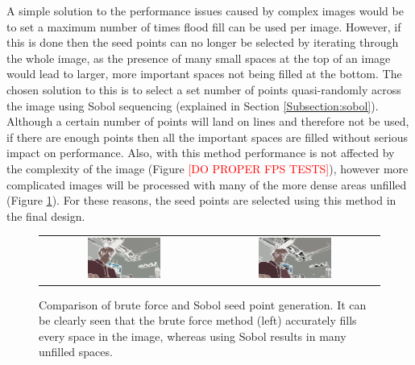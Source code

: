 A simple solution to the performance issues caused by complex images would be to set a maximum number of times flood fill can be used per image. However, if this is done then the seed points can no longer be selected by iterating through the whole image, as the presence of many small spaces at the top of an image would lead to larger, more important spaces not being filled at the bottom. The chosen solution to this is to select a set number of points quasi-randomly across the image using Sobol sequencing (explained in Section \ref{Subsection:sobol}). Although a certain number of points will land on lines and therefore not be used, if there are enough points then all the important spaces are filled without serious impact on performance. Also, with this method performance is not affected by the complexity of the image (Figure \textcolor{red}{[DO PROPER FPS TESTS]}), however more complicated images will be processed with many of the more dense areas unfilled (Figure \ref{fig:BrutevsSobol}). For these reasons, the seed points are selected using this method in the final design.

\begin{figure}[H]
    \begin{center}
    \begin{tabular}{ c c }
        \includegraphics[width=0.45\textwidth]{Figures/Brute.jpg} &
        \includegraphics[width=0.45\textwidth]{Figures/Sobol.jpg}
    \end{tabular}
    \caption[Comparison of brute force and Sobol seed point generation]{Comparison of brute force and Sobol seed point generation. It can be clearly seen that the brute force method (left) accurately fills every space in the image, whereas using Sobol results in many unfilled spaces.}
    \label{fig:BrutevsSobol}
    \end{center}
\end{figure}

